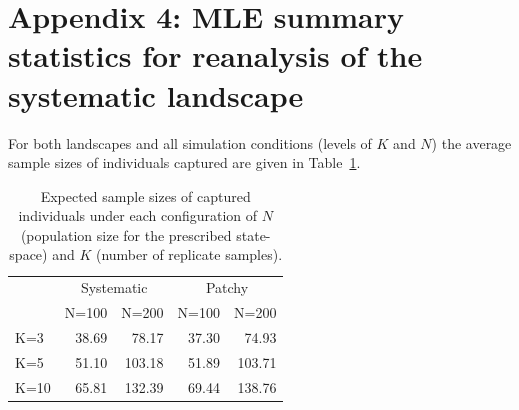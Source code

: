 \documentclass[12pt]{article}
\begin{document}
\begin{spacing}{1.2}
{\begin{verbatim}
\end{verbatim}
}

\newpage

\section*{Appendix 4:  MLE summary statistics for reanalysis of the
  systematic landscape}


For both landscapes and all simulation conditions (levels of $K$ and
$N$) the average sample sizes of individuals captured are given in
Table~\ref{tab.samplesize}.  


\begin{table}
\centering
\caption{
Expected sample sizes of captured individuals under each configuration of
$N$ (population size for the prescribed state-space) and $K$ (number of replicate samples).
}
\begin{tabular}{l|rrrr}
 & \multicolumn{2}{c}{Systematic} & \multicolumn{2}{c}{Patchy}  \\
    & N=100 &  N=200  &   N=100 &  N=200  \\ \hline
K=3 &  38.69 &   78.17  &   37.30 &   74.93  \\
K=5 &  51.10 &  103.18  &   51.89 &  103.71 \\
K=10&  65.81 &  132.39  &   69.44 &  138.76 \\
\end{tabular}
\label{tab.samplesize}
\end{table}




\end{spacing}
\end{document}
